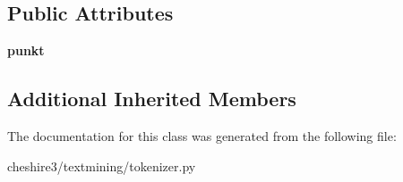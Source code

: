\subsection*{Public Attributes}
\begin{DoxyCompactItemize}
\item 
\hypertarget{classcheshire3_1_1textmining_1_1tokenizer_1_1_nltk_punkt_word_tokenizer_a36bd16e9328e36be3c4b9ac6d61dd153}{{\bfseries punkt}}\label{classcheshire3_1_1textmining_1_1tokenizer_1_1_nltk_punkt_word_tokenizer_a36bd16e9328e36be3c4b9ac6d61dd153}

\end{DoxyCompactItemize}
\subsection*{Additional Inherited Members}


The documentation for this class was generated from the following file\-:\begin{DoxyCompactItemize}
\item 
cheshire3/textmining/tokenizer.\-py\end{DoxyCompactItemize}
